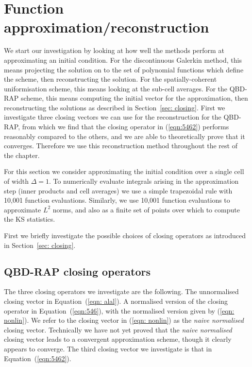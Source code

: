 


	




\section{Function approximation/reconstruction}
We start our investigation by looking at how well the methods perform at approximating an initial condition. For the discontinuous Galerkin method, this means projecting the solution on to the set of polynomial functions which define the scheme, then reconstructing the solution. For the spatially-coherent uniformisation scheme, this means looking at the sub-cell averages. For the QBD-RAP scheme, this means computing the initial vector for the approximation, then reconstructing the solutions as described in Section~\ref{sec: closing}. First we investigate three closing vectors we can use for the reconstruction for the QBD-RAP, from which we find that the closing operator in (\ref{eqn:5462}) performs reasonably compared to the others, and we are able to theoretically prove that it converges. Therefore we use this reconstruction method throughout the rest of the chapter.

For this section we consider approximating the initial condition over a single cell of width \(\Delta = 1\). To numerically evaluate integrals arising in the approximation step (inner products and cell averages) we use a simple trapezoidal rule with 10,001 function evaluations. Similarly, we use 10,001 function evaluations to approximate \(L^2\) norms, and also as a finite set of points over which to compute the KS statistics. 

First we briefly investigate the possible choices of closing operators as introduced in Section~\ref{sec: closing}. 

\subsection{QBD-RAP closing operators}
The three closing operators we investigate are the following. The unnormalised closing vector in Equation~(\ref{eqn: alal}). A normalised version of the closing operator in Equation~(\ref{eqn:546}), with the normalised version given by (\ref{eqn: nonlin}). We refer to the closing vector in (\ref{eqn: nonlin}) as the \emph{naive normalised} closing vector. Technically we have not yet proved that the \emph{naive normalised} closing vector leads to a convergent approximation scheme, though it clearly appears to converge. The third closing vector we investigate is that in Equation~(\ref{eqn:5462}). 

